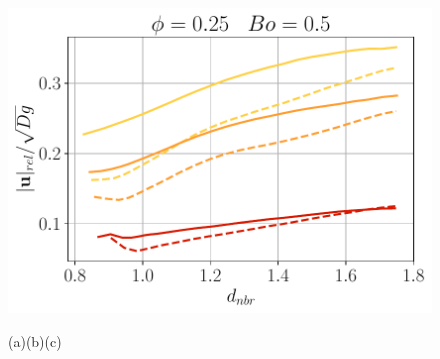 \begin{figure}[h!]
        \includegraphics[height=0.16\textheight]{image/N_10/Pcond/probav_relBo0_5PHI0_25.pdf}

        \hspace{3cm}(a)\hfill(b)\hfill(c)\hspace{3cm}
        

\end{figure}
